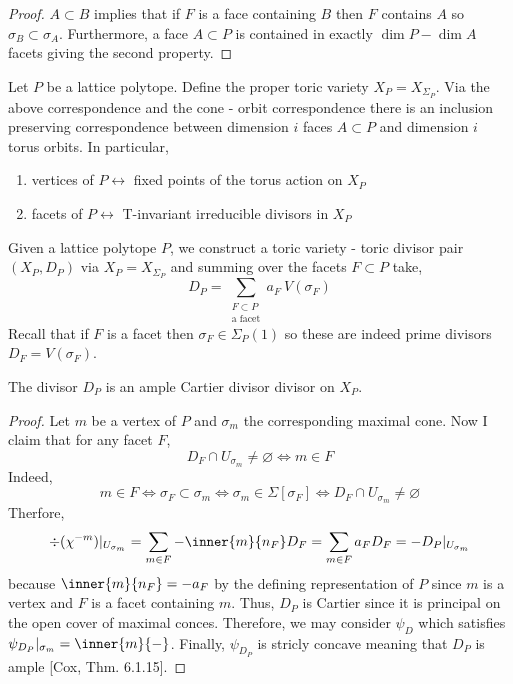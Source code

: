 \begin{proof}
$A \subset B$ implies that if $F$ is a face containing $B$ then $F$ contains $A$ so $\sigma_B \subset \sigma_A$. Furthermore, a face $A \subset P$ is contained in exactly $\dim{P} - \dim{A}$ facets giving the second property. 
\end{proof}

\begin{definition}
Let $P$ be a lattice polytope. Define the proper toric variety $X_P = X_{\Sigma_P}$. Via the above correspondence and the cone - orbit correspondence there is an inclusion preserving correspondence between dimension $i$ faces $A \subset P$ and dimension $i$ torus orbits. In particular,
\begin{enumerate}
\item vertices of $P \leftrightarrow$ fixed points of the torus action on $X_P$
\item facets of $P \leftrightarrow$ T-invariant irreducible divisors in $X_P$
\end{enumerate}
\end{definition}

\begin{definition}
Given a lattice polytope $P$, we construct a toric variety - toric divisor pair $(X_P, D_P)$ via $X_P = X_{\Sigma_P}$ and summing over the facets $F \subset P$ take,
\[ D_P = \sum_{\substack{F \subset P \\ \text{a facet}}} a_F \: V(\sigma_F) \]
Recall that if $F$ is a facet then $\sigma_F \in \Sigma_P(1)$ so these are indeed prime divisors $D_F = V(\sigma_F)$.
\end{definition}

\begin{proposition} \label{polytope_div_ample}
The divisor $D_P$ is an ample Cartier divisor divisor on $X_P$.
\end{proposition}

\begin{proof}
Let $m$ be a vertex of $P$ and $\sigma_m$ the corresponding maximal cone. Now I claim that for any facet $F$,
\[ D_F \cap U_{\sigma_m} \neq \varnothing \iff m \in F \]
Indeed,
\[ m \in F \iff \sigma_F \subset \sigma_m \iff \sigma_m \in \Sigma[\sigma_F] \iff D_F \cap U_{\sigma_m} \neq \varnothing \]
Therfore,
\[ \div{(\chi^{-m})} |_{U_{\sigma_m}} = \sum_{m \in F} - \inner{m}{n_F} D_F = \sum_{m \in F} a_F D_F  = - D_P |_{U_{\sigma_m}} \]
because $\inner{m}{n_F} = - a_F$ by the defining representation of $P$ since $m$ is a vertex and $F$ is a facet containing $m$.
Thus, $D_P$ is Cartier since it is principal on the open cover of maximal conces. Therefore, we may consider $\psi_D$ which satisfies $\psi_{D_P} |_{\sigma_m} = \inner{m}{-}$. Finally, $\psi_{D_P}$ is stricly concave meaning that $D_P$ is ample [Cox, Thm. 6.1.15].
\end{proof}

